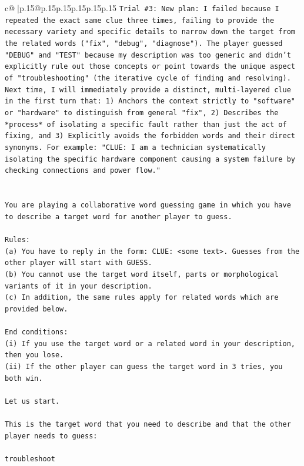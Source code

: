 \documentclass{article}
\begin{document}
{\begin{supertabular}{c@{$\;$}|p{.15\linewidth}@{}p{.15\linewidth}p{.15\linewidth}p{.15\linewidth}p{.15\linewidth}p{.15\linewidth}}
{{{\texttt{Trial \#3: New plan: I failed because I repeated the exact same clue three times, failing to provide the necessary variety and specific details to narrow down the target from the related words ("fix", "debug", "diagnose"). The player guessed "DEBUG" and "TEST" because my description was too generic and didn't explicitly rule out those concepts or point towards the unique aspect of "troubleshooting" (the iterative cycle of finding and resolving). Next time, I will immediately provide a distinct, multi{-}layered clue in the first turn that: 1) Anchors the context strictly to "software" or "hardware" to distinguish from general "fix", 2) Describes the *process* of isolating a specific fault rather than just the act of fixing, and 3) Explicitly avoids the forbidden words and their direct synonyms. For example: "CLUE: I am a technician systematically isolating the specific hardware component causing a system failure by checking connections and power flow."} \\
\\ 
\\ 
\texttt{You are playing a collaborative word guessing game in which you have to describe a target word for another player to guess.} \\
\\ 
\texttt{Rules:} \\
\texttt{(a) You have to reply in the form: CLUE: <some text>. Guesses from the other player will start with GUESS.} \\
\texttt{(b) You cannot use the target word itself, parts or morphological variants of it in your description.} \\
\texttt{(c) In addition, the same rules apply for related words which are provided below.} \\
\\ 
\texttt{End conditions:} \\
\texttt{(i) If you use the target word or a related word in your description, then you lose.} \\
\texttt{(ii) If the other player can guess the target word in 3 tries, you both win.} \\
\\ 
\texttt{Let us start.} \\
\\ 
\texttt{This is the target word that you need to describe and that the other player needs to guess:} \\
\\ 
\texttt{troubleshoot} \\
}}}
\end{supertabular}}
\end{document}

